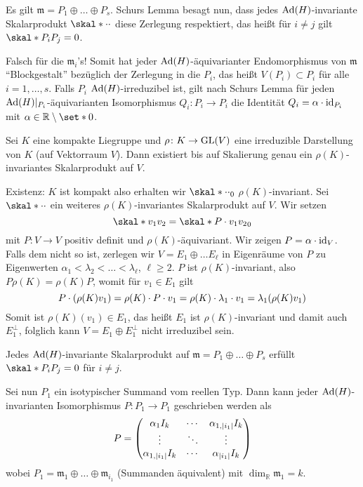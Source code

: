 Es gilt $\mathfrak{m} = P_1 \oplus  \ldots \oplus P_s$. Schurs Lemma besagt nun, dass jedes $\Ad(H)$-invariante Skalarprodukt $\skal*{\cdot }{\cdot }$ diese Zerlegung respektiert, das heißt für $i\neq j$ gilt $\skal*{P_i}{P_j}=0$.

\begin{bemerkung*}[{name=[Blockgestalt der Zerlegung und Schurs Lemma]}]
	Falsch für die $\mathfrak{m}_i$'s!
	Somit hat jeder $\Ad(H)$-äquivarianter Endomorphismus von $\mathfrak{m}$ \enquote{Blockgestalt} bezüglich der Zerlegung in die $P_i$, das heißt $V(P_i) \subset P_i$ für alle $i=1,\ldots ,s$.
	Falls $P_i$ $\Ad(H)$-irreduzibel ist, gilt nach Schurs Lemma für jeden $\Ad(H)|_{P_i}$-äquivarianten Isomorphismus $Q_i \colon P_i \to P_i$ die Identität $Q_i = \alpha \cdot {\id_{P_i}}$ mit $\alpha \in \mathbb{R}\setminus \set*{0}$.
\end{bemerkung*}

 Sei $K$ eine kompakte Liegruppe und $\rho \colon K \to \GL(V)$ eine irreduzible Darstellung von $K$ (auf Vektorraum $V$).
Dann existiert bis auf Skalierung genau ein $\rho(K)$-invariantes Skalarprodukt auf $V$.
\begin{beweis}
	Existenz: $K$ ist kompakt also erhalten wir $\skal*{\cdot }{\cdot }_0$ $\rho(K)$-invariant.
	Sei $\skal*{\cdot }{\cdot }$ ein weiteres $\rho(K)$-invariantes Skalarprodukt auf $V$.
	Wir setzen 
	\[
		\skal*{v_1}{v_2} = \skal*{P \cdot v_1}{v_2}_0
	\]
	mit $P \colon V\to V$ positiv definit und $\rho(K)$-äquivariant.
	Wir zeigen $P = \alpha \cdot {\id_V}$.
	Falls dem nicht so ist, zerlegen wir $V = E_1 \oplus  \ldots E_\ell$ in Eigenräume von $P$ zu Eigenwerten $\alpha_1 < \lambda_2 < \ldots < \lambda_\ell$, $\ell \ge 2$.
	$P$ ist $\rho(K)$-invariant, also $P \rho(K) = \rho(K) P$, womit für $v_1 \in  E_1$ gilt
	\[
		P \cdot \enbrace*{\rho(K) v_1} = \rho(K) \cdot P \cdot v_1 = \rho(K) \cdot \lambda_1 \cdot v_1 = \lambda_1 \enbrace*{\rho(K) v_1}
	\]
	Somit ist $\rho(K)(v_1) \in E_1$, das heißt $E_1$ ist $\rho(K)$-invariant und damit auch $E_1^\perp$, folglich kann $V =E_1 \oplus E_1^\perp$ nicht irreduzibel sein.
\end{beweis}

\begin{korollarB}[{name=[Zerlegung und Skalarprodukt]}]
	Jedes $\Ad(H)$-invariante Skalarprodukt auf $\mathfrak{m} = P_1 \oplus \ldots \oplus P_s$ erfüllt $\skal*{P_i}{P_j}=0$ für $i\neq j$.
\end{korollarB}

Sei nun $P_1$ ein isotypischer Summand vom reellen Typ.
Dann kann jeder $\Ad(H)$-invarianten Isomorphismus $P \colon P_1 \to P_1$ geschrieben werden als
\[
	P= \begin{pmatrix}
		\alpha_1 I_k & \cdots &  \alpha_{1,\abs*{i_1} }I_k \\
		\vdots & \ddots & \vdots \\
		\alpha_{1,\abs*{i_1}} I_k & \cdots & \alpha_{\abs{i_1}} I_k
	\end{pmatrix}
\]
wobei $P_1 = \mathfrak{m}_1 \oplus  \ldots \oplus \mathfrak{m}_{i_1}$ (Summanden äquivalent) mit $\dim_\mathbb{R} \mathfrak{m}_1 = k$.

